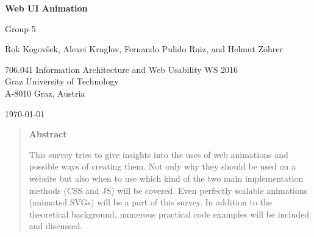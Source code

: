 \documentclass[11pt,onecolumn,twoside]{report}
\begin{document}
\keithdate

\normalsize
\pagestyle{empty}         %




\begin{titlepage}

\begin{center}
{\Large \sffamily \bfseries Web UI Animation}

\vspace{1cm}


{\large\sffamily Group 5}

\vspace{5mm}

{\large\sffamily Rok Kogovšek, Alexei Kruglov, Fernando Pulido Ruiz, and Helmut Zöhrer}

\vspace{1cm}



{\large
706.041 Information Architecture and Web Usability WS 2016 \\
Graz University of Technology \\
A-8010 Graz, Austria  \\[1cm]
}

\vspace{1cm}


{\large \today}


\end{center}



\vspace{2cm}

\begin{quote}
\begin{center}
{\large\sffamily\bfseries Abstract}
\end{center}

This survey tries to give insights into the uses of web animations and possible ways of creating them. Not only why they should be used on a website but also when to use which kind of the two main implementation methods (CSS and JS) will be covered. Even perfectly scalable animations (animated SVGs) will be a part of this survey. In addition to the theoretical background, numerous practical code examples will be included and discussed. 


\end{quote}
\end{titlepage}
\end{document}
